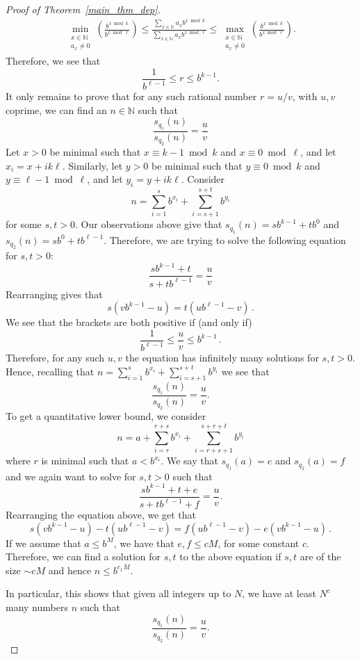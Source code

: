 \documentclass[12pt]{amsart}
\renewcommand{\leq}{\leqslant}
\theoremstyle{definition}
\numberwithin{equation}{section}
\newcommand\NN{\mathbb{N}}
\numberwithin{equation}{section}
\begin{document}
\begin{proof}[Proof of Theorem~\ref{main_thm_dep}]
	\begin{align*}
		\min_{\substack{x\in\NN\\a_x\neq 0}}\left(\frac{b^{x\bmod k}}{b^{x\bmod \ell}}\right) \leq \frac{\sum_{x\in \NN}a_xb^{x\bmod k}}{\sum_{x\in \NN}a_xb^{x\bmod \ell}} \leq \max_{\substack{x\in\NN\\a_x\neq 0}}\left(\frac{b^{x\bmod k}}{b^{x\bmod \ell}}\right).
	\end{align*}
	Therefore, we see that 
	\[ 
	\frac{1}{b^{\ell-1}}\leq r \leq b^{k-1}.
	\]
	It only remains to prove that for any such rational number $r=u/v$, with $u,v$ coprime, we can find an $n\in \NN$ such that
	\[
	\frac{s_{q_1}(n)}{s_{q_2}(n)}=\frac uv
	\]
	Let $x>0$ be minimal such that $x\equiv k-1 \bmod k$ and $x\equiv 0 \bmod \ell$, and let $x_i=x+ik\ell$. Similarly, let $y>0$ be minimal such that $y\equiv 0 \bmod k$ and $y\equiv \ell-1 \bmod \ell$, and let $y_i=y+ik\ell$. Consider
	\[
	n=\sum_{i=1}^{s}b^{x_i}+\sum_{i=s+1}^{s+t}b^{y_i}
	\]
	for some $s,t>0$. Our observations above give that $s_{q_1}(n)= sb^{k-1}+tb^{0}$ and $s_{q_2}(n)= sb^{0}+tb^{\ell-1}$. Therefore, we are trying to solve the following equation for $s,t>0$:
	\[
	\frac{sb^{k-1}+t}{s+tb^{\ell-1}}=\frac uv
	\]
	Rearranging gives that
	\[
	s(vb^{k-1}-u)=t(ub^{\ell-1}-v)\,.
	\]
	We see that the brackets are both positive if (and only if)
	\[ 
	\frac{1}{b^{\ell-1}}\leq \frac uv \leq b^{k-1}\,.
	\]
	Therefore, for any such $u,v$ the equation has infinitely many solutions for $s,t>0$. Hence, recalling that $n=\sum_{i=1}^{s}b^{x_i}+\sum_{i=s+1}^{s+t}b^{y_i}$ we see that
	\[
	\frac{s_{q_1}(n)}{s_{q_2}(n)}=\frac uv.
	\]
	To get a quantitative lower bound, we consider 
	\[
	n=a+\sum_{i=r}^{r+s}b^{x_i}+\sum_{i=r+s+1}^{s+r+t}b^{y_i}
	\]
	where $r$ is minimal such that $a<b^{x_i}$. We say that $s_{q_1}(a)=e$ and $s_{q_2}(a)=f$ and we again want to solve for $s,t>0$ such that
	\[
	\frac{sb^{k-1}+t+e}{s+tb^{\ell-1}+f}=\frac uv.
	\]
	Rearranging the equation above, we get that
	\[
	s(vb^{k-1}-u)-t(ub^{\ell-1}-v)=f(ub^{\ell-1}-v)-e(vb^{k-1}-u)\,.
	\]
	If we assume that $a\leq b^M$, we have that $e,f\leq cM$, for some constant $c$. Therefore, we can find a solution for $s,t$ to the above equation if $s,t$ are of the size $\sim cM$ and hence $n\leq b^{c_1M}$. 
	
	In particular, this shows that given all integers up to $N$, we have at least $N^c$ many numbers $n$ such that
	\[\frac{s_{q_1}(n)}{s_{q_2}(n)}=\frac uv.\]
\end{proof}


\printbibliography
%
\end{document}
